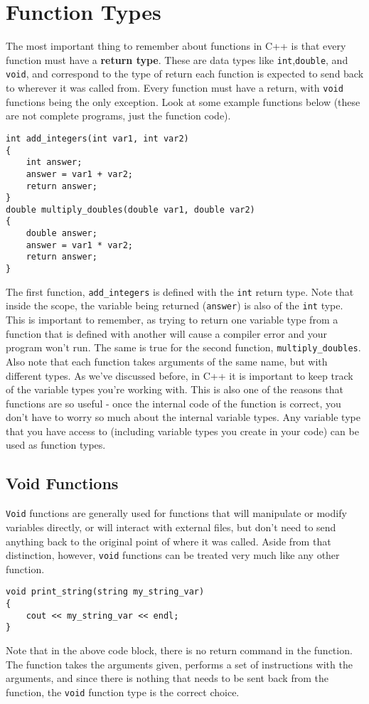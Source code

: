 \section{Function Types}
The most important thing to remember about functions in C++ is that every function must have a \textbf{return type}.  These are data types like \texttt{int},\texttt{double}, and \texttt{void}, and correspond to the type of return each function is expected to send back to wherever it was called from.  Every function must have a return, with \texttt{void} functions being the only exception.  Look at some example functions below (these are not complete programs, just the function code).

\begin{verbatim}
int add_integers(int var1, int var2)
{ 
    int answer;
    answer = var1 + var2;
    return answer;
}
double multiply_doubles(double var1, double var2)
{ 
    double answer;
    answer = var1 * var2;
    return answer;
}
\end{verbatim}

The first function, \texttt{add\_integers} is defined with the \texttt{int} return type.  Note that inside the scope, the variable being returned (\texttt{answer}) is also of the \texttt{int} type.  This is important to remember, as trying to return one variable type from a function that is defined with another will cause a compiler error and your program won't run.  The same is true for the second function, \texttt{multiply\_doubles}.  Also note that each function takes arguments of the same name, but with different types.  As we've discussed before, in C++ it is important to keep track of the variable types you're working with.  This is also one of the reasons that functions are so useful - once the internal code of the function is correct, you don't have to worry so much about the internal variable types.  Any variable type that you have access to (including variable types you create in your code) can be used as function types.

\subsection{Void Functions}
\texttt{Void} functions are generally used for functions that will manipulate or modify variables directly, or will interact with external files, but don't need to send anything back to the original point of where it was called.  Aside from that distinction, however, \texttt{void} functions can be treated very much like any other function.

\begin{verbatim}
void print_string(string my_string_var)
{
    cout << my_string_var << endl;
}
\end{verbatim}

Note that in the above code block, there is no return command in the function.  The function takes the arguments given, performs a set of instructions with the arguments, and since there is nothing that needs to be sent back from the function, the \texttt{void} function type is the correct choice.
